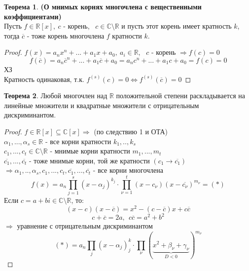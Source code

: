 \documentclass[a4paper, 12pt]{article}
\newcommand{\R}{\mathbb R}
\theoremstyle{definition}
\newtheorem*{theorem}{Теорема}
\begin{document}
  \begin{theorem}\textbf{(О мнимых корнях многочлена с вещественными коэффициентами)} \\
    Пусть $f \in \R[x], \ c$ - корень, \ $c \in \mathbb{C}\setminus \R$ и пусть этот корень имеет кратность $k$, тогда $\overline{c}$ - тоже корень многочлена $f$ кратности $k$.     
  \end{theorem} 
  \begin{proof}
    $f(x) = a_nx^n+...+a_1x+a_0, \ a_i \in \R$, \ $c$ - корень $\Longrightarrow f(c) =0$  
    $$f(\overline{c}) = a_n\overline{c}^n+...+a_1\overline{c}+a_0 = a_nc^n+...+a_1c+a_0 = f(c) = 0$$  ХЗ \\
    Кратность одинаковая, т.к. $f^{(s)}(c)=0 \Longleftrightarrow f^{(s)}( \overline{c})=0$ 
  \end{proof}
  \begin{theorem}
    Любой многочлен над $\R$ положительной степени раскладывается на линейные множители и квадратные множители с отрицательным дискриминантом.
  \end{theorem}
  \begin{proof}
    $f\in \R[x] \subseteq \mathbb{C}[x] \Longrightarrow $ (по следствию 1 и ОТА) \\
    $\alpha_1,...,\alpha_s \in \R$ - все корни кратности $k_1,..,k_s$\\
    $c_1,...,c_t \in \mathbb{C}\setminus \R$ - мнимые корни кратности $m_1,...,m_t$\\
    $\overline{c_1},...,\overline{c_t}$ - тоже мнимые корни, той же кратности $(c_1 \to \overline{c_1})$\\
    $\Longrightarrow \alpha_1,..,\alpha_s,c_1,...,c_t,\overline{c_1},...,\overline{c_t}$ - все корни многочлена
    $$f(x) = a_n \prod\limits_{j=1}^{s}(x-\alpha_j)^{k_j} \cdot \prod\limits_{\nu=1}^{t}(x-c_{\nu})(x-\overline{c_{\nu}})^{m_\nu} = (*)$$
    Если $c=a+bi \in \mathbb{C}\setminus \R$, то:
    $$(x-c)(x-\overline{c}) = x^2 - (c-\overline{c})x + c \overline{c}$$
    $$c+\overline{c} = 2a, \ \ c \overline{c} = a^2 + b^2$$
    $\Longrightarrow $ уравнение с отрицательным дискриминантом    
    $$(*) = a_n \prod\limits_{j}(x-\alpha_j)^k_j \cdot \prod\limits_{\nu}(\underbrace{x^2+\beta_{\nu}+ \gamma_{\nu}}_{D<0})^{m_\nu} $$    
  \end{proof}
\end{document}
